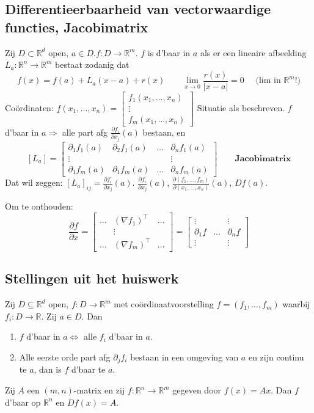 \documentclass[a4paper]{exam}
\theoremstyle{definition}
\newcommand{\reals}{\mathbb{R}}
\begin{document}
	\subsection{Differentieerbaarheid van vectorwaardige functies, Jacobimatrix}
	Zij $D \subset \reals^d$ open, $a \in D. f: D \rightarrow \reals^m$. $f$ is d'baar in $a$ als er een lineaire afbeelding $L_a :\reals^n \rightarrow \reals^m$ bestaat zodanig dat \[f(x)=f(a)+L_a (x-a) + r(x) \qquad \lim_{x \rightarrow 0} \frac{r(x)}{|x-a|} =0 \quad\text{ (lim in } \reals^m \text{!)}\]
	Co\"ordinaten: $\underline{f}(x_1,\dots ,x_n)=\begin{bmatrix}
	f_1 (x_1, \dots ,x_n) \\
	\vdots \\
	f_m (x_1, \dots ,x_n)
	\end{bmatrix}$
	\theorem[en definitie] Situatie als beschreven. $f$ d'baar in $a \Rightarrow$ alle part afg $\frac{\partial f_i}{\partial x_j}(a)$ bestaan, en
	\[[L_a] = \begin{bmatrix}
	\partial_1 f_1 (a) & \partial_2 f_1 (a) & \dots &\partial_n f_1 (a) \\
	\vdots & & & \vdots \\
	\partial_1 f_m (a) & \partial_1 f_m (a) & \dots &\partial_n f_m (a)
	\end{bmatrix} \qquad \textbf{Jacobimatrix}\]
	Dat wil zeggen: $[L_a]_{ij}=\frac{\partial f_i}{\partial x_j}(a)$.
	\nota $\frac{\partial f_i}{\partial x_j}(a)$, $\frac{\partial (f_1,\dots,f_m)}{\partial (x_1,\dots,x_n)}(a)$, $ Df(a) $.
	
	Om te onthouden:
	\[ \frac{\partial f}{\partial x} = \begin{bmatrix}
	\dots & (\nabla f_1)^\top & \dots \\
	& \vdots & \\
	\dots & (\nabla f_m)^\top & \dots
	\end{bmatrix} =
	\begin{bmatrix}
	\vdots & & \vdots \\
	\partial_1 \underline{f} & \dots & \partial_n \underline{f} \\
	\vdots & & \vdots
	\end{bmatrix}\]
	
	\subsection{Stellingen uit het huiswerk}
	\theorem Zij $ D \subseteq \reals^d $ open, $ f: D \rightarrow \reals^m $ met co\"ordinaatvoorstelling $ f=(f_1,\dots,f_m) $ waarbij $ f_i : D \rightarrow \reals $. Zij $ a \in D $. Dan
	\begin{enumerate}[(1)]
		\item $ f $ d'baar in $ a \Leftrightarrow $ alle $ f_i $ d'baar in $ a $.
		\item Alle eerste orde part afg $ \partial_j f_i $ bestaan in een omgeving van $ a $ en zijn continu te $ a $, dan is $ f $ d'baar te $ a $.
	\end{enumerate}
	\theorem Zij $ A $ een $ (m,n) $-matrix en zij $ f:\reals^n \rightarrow \reals^m $ gegeven door $ f(x)=Ax $. Dan $ f $ d'baar op $ \reals^n $ en $ Df(x) = A $.
	
\end{document}
